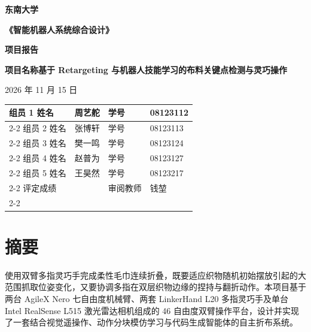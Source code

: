 \documentclass[UTF8,a4paper,12pt,zihao=-4]{ctexart}
\begin{document}
\begin{titlepage}
  \centering
  \vspace*{1.2cm}
  {\bfseries 东\quad 南\quad 大\quad 学\par}
  \vspace{0.9cm}
  {\bfseries 《智能机器人系统综合设计》\par}
  \vspace{0.5cm}
  {\bfseries 项\quad 目\quad 报\quad 告\par}
  \vspace{1.5cm}

  {\bfseries 项目名称\quad 基于 Retargeting 与机器人技能学习的布料关键点检测与灵巧操作\par}
  \vspace{0.8cm}
  { 2026 年 11 月 15 日\par}
  \vspace{1.2cm}

  \renewcommand{\arraystretch}{1.75}
  \begin{tabular}{p{3.2cm}p{4.5cm}p{2.2cm}p{4.2cm}}
    组员 1 姓名 & 周艺舵 & 学号 & 08123112 \\ \cline{2-2}\cline{4-4}
    组员 2 姓名 & 张博轩 & 学号 & 08123113 \\ \cline{2-2}\cline{4-4}
    组员 3 姓名 & 樊一鸣 & 学号 & 08123124 \\ \cline{2-2}\cline{4-4}
    组员 4 姓名 & 赵普为 & 学号 & 08123127 \\ \cline{2-2}\cline{4-4}
    组员 5 姓名 & 王昊然 & 学号 & 08123217 \\ \cline{2-2}\cline{4-4}
    评定成绩   &               & 审阅教师 & 钱堃 \\ \cline{2-2}\cline{4-4}
  \end{tabular}
  \vfill
\end{titlepage}

\section*{摘\quad 要}

使用双臂多指灵巧手完成柔性毛巾连续折叠，既要适应织物随机初始摆放引起的大范围抓取位姿变化，又要协调多指在双层织物边缘的捏持与翻折动作。本项目基于两台 AgileX Nero 七自由度机械臂、两套 LinkerHand L20 多指灵巧手及单台 Intel RealSense L515 激光雷达相机组成的 46 自由度双臂操作平台，设计并实现了一套结合视觉遥操作、动作分块模仿学习与代码生成智能体的自主折布系统。
\end{document}
